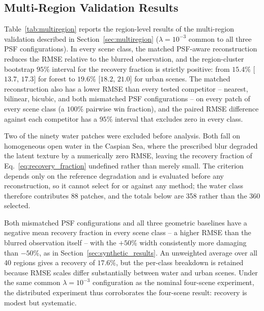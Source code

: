 \documentclass[journal]{IEEEtran}
\newcommand{\psf}{PSF\xspace}
\begin{document}
\subsection{Multi-Region Validation Results}
\label{sec:multiregion_results}

Table~\ref{tab:multiregion} reports the region-level results of the multi-region validation described in Section~\ref{sec:multiregion} ($\lambda=10^{-3}$ common to all three \psf configurations). In every scene class, the matched \psf-aware reconstruction reduces the RMSE relative to the blurred observation, and the region-cluster bootstrap $95\%$ interval for the recovery fraction is strictly positive: from $15.4\%$ [$13.7$, $17.3$] for forest to $19.6\%$ [$18.2$, $21.0$] for urban scenes. The matched reconstruction also has a lower RMSE than every tested competitor -- nearest, bilinear, bicubic, and both mismatched \psf configurations -- on every patch of every scene class (a $100\%$ pairwise win fraction), and the paired RMSE difference against each competitor has a $95\%$ interval that excludes zero in every class.

Two of the ninety water patches were excluded before analysis. Both fall on homogeneous open water in the Caspian Sea, where the prescribed blur degraded the latent texture by a numerically zero RMSE, leaving the recovery fraction of Eq.~\eqref{eq:recovery_fraction} undefined rather than merely small. The criterion depends only on the reference degradation and is evaluated before any reconstruction, so it cannot select for or against any method; the water class therefore contributes 88 patches, and the totals below are 358 rather than the 360 selected.

Both mismatched \psf configurations and all three geometric baselines have a negative mean recovery fraction in every scene class -- a higher RMSE than the blurred observation itself -- with the $+50\%$ width consistently more damaging than $-50\%$, as in Section~\ref{sec:synthetic_results}. An unweighted average over all 40 regions gives a recovery of $17.6\%$, but the per-class breakdown is retained because RMSE scales differ substantially between water and urban scenes. Under the same common $\lambda=10^{-3}$ configuration as the nominal four-scene experiment, the distributed experiment thus corroborates the four-scene result: recovery is modest but systematic.
\end{document}
